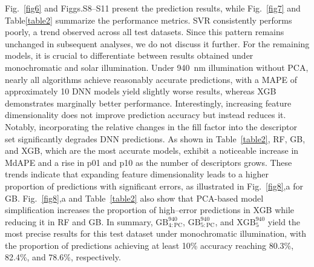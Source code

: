 \documentclass[a4paper,fleqn]{cas-sc}
\begin{document}
Fig.~\ref{fig6} and Figgs.S8--S11 present the prediction results, 
while Fig.~\ref{fig7} and Table\ref{table2} summarize the performance metrics.
SVR consistently performs poorly, a trend observed across all test datasets.
Since this pattern remains unchanged in subsequent analyses, we do not discuss it further.
For the remaining models, it is crucial to differentiate between results obtained under monochromatic and solar illumination.
Under 940~nm illumination without PCA, nearly all algorithms achieve reasonably accurate predictions, with a MAPE of approximately 10%
DNN models yield slightly worse results, whereas XGB demonstrates marginally better performance.
Interestingly, increasing feature dimensionality does not improve prediction accuracy but instead reduces it.
Notably, incorporating the relative changes in the fill factor into the descriptor set significantly degrades DNN predictions.
As shown in Table~\ref{table2}, RF, GB, and XGB, which are the most accurate models, exhibit a noticeable increase 
in MdAPE and a rise in p01 and p10 as the number of descriptors grows.
These trends indicate that expanding feature dimensionality leads to a higher proportion of predictions with significant errors, 
as illustrated in Fig.~\ref{fig8},a for GB.
Fig.~\ref{fig8},a and Table~\ref{table2} also show that PCA-based model simplification increases the proportion of high--error predictions 
in XGB while reducing it in RF and GB.
In summary, $\mathrm{GB}^{940}_\mathrm{4:PC}$, $\mathrm{GB}^{940}_\mathrm{5:PC}$, 
and $\mathrm{XGB}^{940}_5$ yield the most precise results for this test dataset under monochromatic illumination, 
with the proportion of predictions achieving at least 10\% accuracy reaching 80.3\%, 82.4\%, and 78.6\%, respectively.
\end{document}
